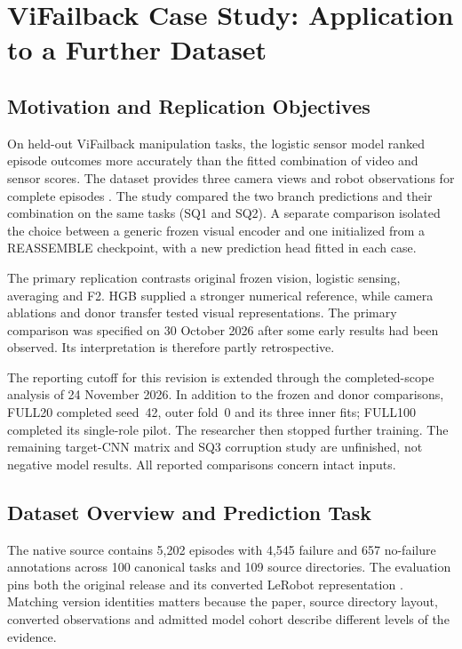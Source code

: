 \chapter{ViFailback Case Study: Application to a Further Dataset}
\label{ch:vifailback}

\section{Motivation and Replication Objectives}
On held-out ViFailback manipulation tasks, the logistic sensor model ranked episode
outcomes more accurately than the fitted combination of video and sensor scores. The
dataset provides three camera views and robot observations for complete episodes
\citep{Zeng2026ViFailback}. The study compared the two branch predictions and their
combination on the same tasks (SQ1 and SQ2). A separate comparison isolated the choice
between a generic frozen visual encoder and one initialized from a REASSEMBLE
checkpoint, with a new prediction head fitted in each case.

The primary replication contrasts original frozen vision, logistic sensing, averaging
and F2. HGB supplied a stronger numerical reference, while camera ablations and donor
transfer tested visual representations. The primary comparison was specified on 30
October 2026 after some early results had been observed. Its interpretation is therefore
partly retrospective.

The reporting cutoff for this revision is extended through the completed-scope analysis
of 24 November 2026. In addition to the frozen and donor comparisons, FULL20 completed
seed~42, outer fold~0 and its three inner fits; FULL100 completed its single-role pilot.
The researcher then stopped further training. The remaining target-CNN matrix and SQ3
corruption study are unfinished, not negative model results. All reported comparisons
concern intact inputs.

\section{Dataset Overview and Prediction Task}
The native source contains 5,202 episodes with 4,545 failure and 657 no-failure
annotations across 100 canonical tasks and 109 source directories. The evaluation pins
both the original release and its converted LeRobot representation
\citep{ViFailbackHF2025}. Matching version identities matters because the paper, source
directory layout, converted observations and admitted model cohort describe different
levels of the evidence.

